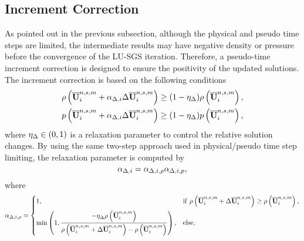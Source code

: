 \subsection{Increment Correction}

As pointed out in the previous subsection, although the physical and pseudo time steps are limited, the intermediate results may have negative density or pressure before the convergence of the LU-SGS iteration.
Therefore, a pseudo-time increment correction is designed to ensure the positivity of the updated solutions.
The increment correction is based on the following conditions
\begin{equation}
    \label{eq:ppLimitInc}
    \begin{aligned}
        \rho\left(\overline{\mathbf{U}}_i^{n,s,m} + \alpha_{\mathrm\Delta,i} \mathrm\Delta \overline{\mathbf{U}}_i^{n,s,m}\right)
         & \geq
        (1- \eta_\mathrm\Delta)
        \rho\left(\overline{\mathbf{U}}_i^{n,s,m}\right), \\
        p\left(\overline{\mathbf{U}}_i^{n,s,m} + \alpha_{\mathrm\Delta,i} \mathrm\Delta \overline{\mathbf{U}}_i^{n,s,m}\right)
         & \geq
        (1- \eta_\mathrm\Delta)
        p\left(\overline{\mathbf{U}}_i^{n,s,m}\right),
    \end{aligned}
\end{equation}
where $\eta_\mathrm\Delta \in (0,1)$ is a relaxation parameter to control the relative solution changes.
By using the same two-step approach used in physical/pseudo time step limiting, the relaxation parameter is computed by
\begin{equation}
    \alpha_{\mathrm\Delta,i}= \alpha_{\mathrm\Delta,i,\rho} \alpha_{\mathrm\Delta,i,p},
\end{equation} 
where
\begin{equation}
	\alpha_{\mathrm\Delta,i,\rho} = \begin{dcases}
		1, & \mathrm{if} \ \rho\left(\overline{\mathbf{U}}^{n,s,m}_i +\mathrm\Delta \overline{\mathbf{U}}_i^{n,s,m}\right) \geq  \rho\left(\overline{\mathbf{U}}^{n,s,m}_i\right), \\
		\min\left(1, \dfrac{-\eta_\mathrm\Delta \rho\left(\overline{\mathbf{U}}^{n,s,m}_i\right)}{\rho \left(\overline{\mathbf{U}}^{n,s,m}_i +\mathrm\Delta \overline{\mathbf{U}}_i^{n,s,m} \right)-  \rho\left(\overline{\mathbf{U}}^{n,s,m}_i\right)} \right), &
		\mathrm{else},
	\end{dcases}
\end{equation}
